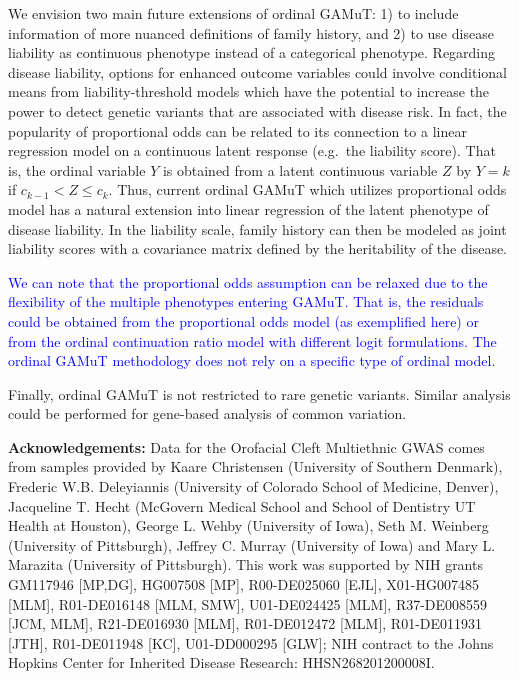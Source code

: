 \documentclass[]{article}
\begin{document}
We envision two main future extensions of ordinal GAMuT: 1) to include
information of more nuanced definitions of family history, and 2) to use
disease liability as continuous phenotype instead of a categorical
phenotype. Regarding disease liability, options for enhanced outcome
variables could involve conditional means from liability-threshold
models which have the potential to increase the power to detect genetic
variants that are associated with disease risk. In fact, the popularity
of proportional odds can be related to its connection to a linear
regression model on a continuous latent response (e.g.~the liability
score). That is, the ordinal variable \(Y\) is obtained from a latent
continuous variable \(Z\) by \(Y=k\) if \(c_{k-1} < Z \leq c_k\). Thus,
current ordinal GAMuT which utilizes proportional odds model has a
natural extension into linear regression of the latent phenotype of
disease liability. In the liability scale, family history can then be
modeled as joint liability scores with a covariance matrix defined by
the heritability of the disease.

\textcolor{blue}{We can note that the proportional odds assumption can be relaxed due to the flexibility of the multiple phenotypes entering GAMuT. That is, the residuals could be obtained from the proportional odds model (as exemplified here) or from the ordinal continuation ratio model with different logit formulations. The ordinal GAMuT methodology does not rely on a specific type of ordinal model.}

Finally, ordinal GAMuT is not restricted to rare genetic variants.
Similar analysis could be performed for gene-based analysis of common
variation.

\textbf{Acknowledgements:} Data for the Orofacial Cleft Multiethnic GWAS
comes from samples provided by Kaare Christensen (University of Southern
Denmark), Frederic W.B. Deleyiannis (University of Colorado School of
Medicine, Denver), Jacqueline T. Hecht (McGovern Medical School and
School of Dentistry UT Health at Houston), George L. Wehby (University
of Iowa), Seth M. Weinberg (University of Pittsburgh), Jeffrey C. Murray
(University of Iowa) and Mary L. Marazita (University of Pittsburgh).
This work was supported by NIH grants GM117946 {[}MP,DG{]}, HG007508
{[}MP{]}, R00-DE025060 {[}EJL{]}, X01-HG007485 {[}MLM{]}, R01-DE016148
{[}MLM, SMW{]}, U01-DE024425 {[}MLM{]}, R37-DE008559 {[}JCM, MLM{]},
R21-DE016930 {[}MLM{]}, R01-DE012472 {[}MLM{]}, R01-DE011931 {[}JTH{]},
R01-DE011948 {[}KC{]}, U01-DD000295 {[}GLW{]}; NIH contract to the Johns
Hopkins Center for Inherited Disease Research: HHSN268201200008I.
\end{document}
